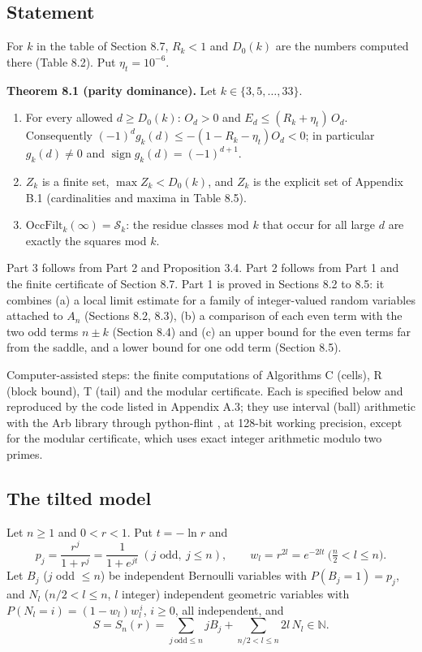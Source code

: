 \subsection{Statement}\label{statement}

For \(k\) in the table of Section 8.7, \(R_k<1\) and \(D_0(k)\) are the numbers computed there (Table 8.2). Put \(\eta_t=10^{-6}\).

\textbf{Theorem 8.1 (parity dominance).} Let \(k\in\{3,5,\dots,33\}\).

\begin{enumerate}
\def\labelenumi{\arabic{enumi}.}
\tightlist
\item
  For every allowed \(d\ge D_0(k)\): \(O_d>0\) and \(E_d\le(R_k+\eta_t)\,O_d\). Consequently \((-1)^dg_k(d)\le-(1-R_k-\eta_t)O_d<0\); in particular \(g_k(d)\ne0\) and \(\operatorname{sign}g_k(d)=(-1)^{d+1}\).
\item
  \(Z_k\) is a finite set, \(\max Z_k<D_0(k)\), and \(Z_k\) is the explicit set of Appendix B.1 (cardinalities and maxima in Table 8.5).
\item
  \(\mathrm{OccFilt}_k(\infty)=\mathcal S_k\): the residue classes mod \(k\) that occur for all large \(d\) are exactly the squares mod \(k\).
\end{enumerate}

Part 3 follows from Part 2 and Proposition 3.4. Part 2 follows from Part 1 and the finite certificate of Section 8.7. Part 1 is proved in Sections 8.2 to 8.5: it combines (a) a local limit estimate for a family of integer-valued random variables attached to \(A_n\) (Sections 8.2, 8.3), (b) a comparison of each even term with the two odd terms \(n\pm k\) (Section 8.4) and (c) an upper bound for the even terms far from the saddle, and a lower bound for one odd term (Section 8.5).

Computer-assisted steps: the finite computations of Algorithms C (cells), R (block bound), T (tail) and the modular certificate. Each is specified below and reproduced by the code listed in Appendix A.3; they use interval (ball) arithmetic with the Arb library through python-flint \cite{Arb}, at 128-bit working precision, except for the modular certificate, which uses exact integer arithmetic modulo two primes.

\subsection{The tilted model}\label{the-tilted-model}

Let \(n\ge1\) and \(0<r<1\). Put \(t=-\ln r\) and
\[p_j=\frac{r^j}{1+r^j}=\frac1{1+e^{jt}}\ (j\text{ odd},\ j\le n),\qquad w_l=r^{2l}=e^{-2lt}\ \bigl(\tfrac n2<l\le n\bigr).\]
Let \(B_j\) (\(j\) odd \(\le n\)) be independent Bernoulli variables with \(P(B_j=1)=p_j\), and \(N_l\) (\(n/2<l\le n\), \(l\) integer) independent geometric variables with \(P(N_l=i)=(1-w_l)w_l^{\,i}\), \(i\ge0\), all independent, and
\[S=S_n(r)=\sum_{j\ \mathrm{odd}\le n}jB_j+\sum_{n/2<l\le n}2l\,N_l\in\mathbb{N}.\]

